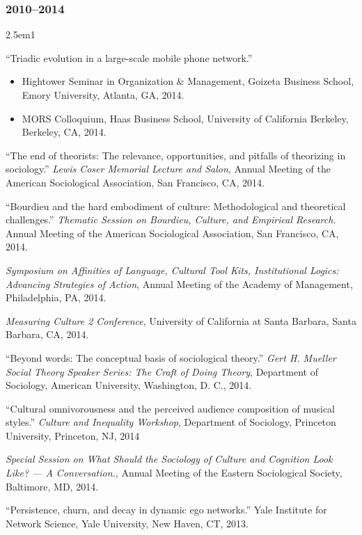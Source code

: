 \documentclass[
]{article}
\providecommand{\tightlist}{%
  \setlength{\itemsep}{0pt}\setlength{\parskip}{0pt}}
\newenvironment{cventry}{\begin{hangparas}{2.5em}{1}}{\end{hangparas}}
\begin{document}
\subsubsection{2010--2014}\label{section-24}

\begin{cventry}

``Triadic evolution in a large-scale mobile phone network.''

\begin{itemize}
\tightlist
\item
  Hightower Seminar in Organization \& Management, Goizeta Business
  School, Emory University, Atlanta, GA, 2014.
\item
  MORS Colloquium, Haas Business School, University of California
  Berkeley, Berkeley, CA, 2014.
\end{itemize}

``The end of theorists: The relevance, opportunities, and pitfalls of
theorizing in sociology.'' \emph{Lewis Coser Memorial Lecture and
Salon}, Annual Meeting of the American Sociological Association, San
Francisco, CA, 2014.

``Bourdieu and the hard embodiment of culture: Methodological and
theoretical challenges.'' \emph{Thematic Session on Bourdieu, Culture,
and Empirical Research.} Annual Meeting of the American Sociological
Association, San Francisco, CA, 2014.

\emph{Symposium on Affinities of Language, Cultural Tool Kits,
Institutional Logics: Advancing Strategies of Action}, Annual Meeting of
the Academy of Management, Philadelphia, PA, 2014.

\emph{Measuring Culture 2 Conference}, University of California at Santa
Barbara, Santa Barbara, CA, 2014.

``Beyond words: The conceptual basis of sociological theory.''
\emph{Gert H. Mueller Social Theory Speaker Series: The Craft of Doing
Theory}, Department of Sociology, American University, Washington, D.
C., 2014.

``Cultural omnivorousness and the perceived audience composition of
musical styles.'' \emph{Culture and Inequality Workshop}, Department of
Sociology, Princeton University, Princeton, NJ, 2014

\emph{Special Session on What Should the Sociology of Culture and
Cognition Look Like? --- A Conversation.}, Annual Meeting of the Eastern
Sociological Society, Baltimore, MD, 2014.

``Persistence, churn, and decay in dynamic ego networks.'' Yale
Institute for Network Science, Yale University, New Haven, CT, 2013.


\end{cventry}
\end{document}
